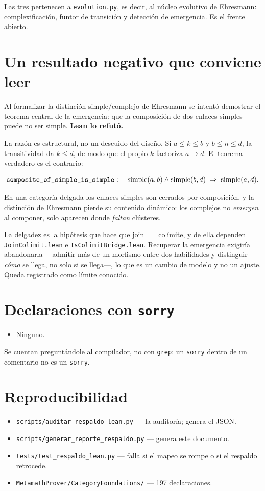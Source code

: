 \documentclass[11pt,a4paper]{article}
\begin{document}
\noindent Las tres pertenecen a \texttt{evolution.py}, es decir, al núcleo
evolutivo de Ehresmann: complexificación, funtor de transición y detección de
emergencia. Es el frente abierto.

\section{Un resultado negativo que conviene leer}

Al formalizar la distinción simple/complejo de Ehresmann se intentó demostrar
el teorema central de la emergencia: que la composición de dos enlaces simples
puede no ser simple. \textbf{Lean lo refutó.}

La razón es estructural, no un descuido del diseño. Si $a \le k \le b$ y
$b \le n \le d$, la transitividad da $k \le d$, de modo que el propio $k$
factoriza $a \to d$. El teorema verdadero es el contrario:

\[
  \text{\texttt{composite\_of\_simple\_is\_simple}}:\quad
  \text{simple}(a,b) \wedge \text{simple}(b,d) \;\Rightarrow\; \text{simple}(a,d).
\]

En una categoría delgada los enlaces simples son cerrados por composición, y la
distinción de Ehresmann pierde su contenido dinámico: los complejos no
\emph{emergen} al componer, solo aparecen donde \emph{faltan} clústeres.

La delgadez es la hipótesis que hace que join $=$ colímite, y de ella dependen
\texttt{JoinColimit.lean} e \texttt{IsColimitBridge.lean}. Recuperar la
emergencia exigiría abandonarla —admitir más de un morfismo entre dos
habilidades y distinguir \emph{cómo} se llega, no solo si se llega—, lo que es
un cambio de modelo y no un ajuste. Queda registrado como límite conocido.

\section{Declaraciones con \texttt{sorry}}

\begin{itemize}
\item Ninguno.
\end{itemize}

\noindent Se cuentan preguntándole al compilador, no con \texttt{grep}: un
\texttt{sorry} dentro de un comentario no es un \texttt{sorry}.

\section*{Reproducibilidad}

\begin{itemize}
\item \texttt{scripts/auditar\_respaldo\_lean.py} — la auditoría; genera el JSON.
\item \texttt{scripts/generar\_reporte\_respaldo.py} — genera este documento.
\item \texttt{tests/test\_respaldo\_lean.py} — falla si el mapeo se rompe o si
      el respaldo retrocede.
\item \texttt{MetamathProver/CategoryFoundations/} — 197 declaraciones.
\end{itemize}
\end{document}
